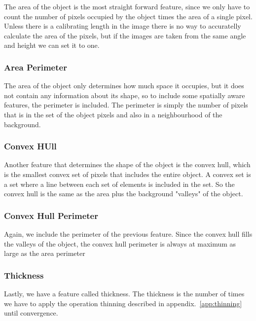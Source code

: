 The area of the object is the most straight forward feature, since we only have to count the number of pixels occupied by the object times the area of a single pixel. Unless there is a calibrating length in the image there is no way to accuratelly calculate the area of the pixels, but if the images are taken from the same angle and height we can set it to one.

\subsubsection{Area Perimeter}

The area of the object only determines how much space it occupies, but it does not contain any information about its shape, so to include some spatially aware features, the perimeter is included. The perimeter is simply the number of pixels that is in the set of the object pixels and also in a neighbourhood of the background.

\subsubsection{Convex HUll}

Another feature that determines the shape of the object is the convex hull, which is the smallest convex set of pixels that includes the entire object. A convex set is a set where a line between each set of elements is included in the set. So the convex hull is the same as the area plus the background "valleys" of the object.

\subsubsection{Convex Hull Perimeter}

Again, we include the perimeter of the previous feature. Since the convex hull fills the valleys of the object, the convex hull perimeter is always at maximum as large as the area perimeter

\subsubsection{Thickness}

Lastly, we have a feature called thickness. The thickness is the number of times we have to apply the operation thinning described in appendix.~\ref{app:thinning} until convergence.

